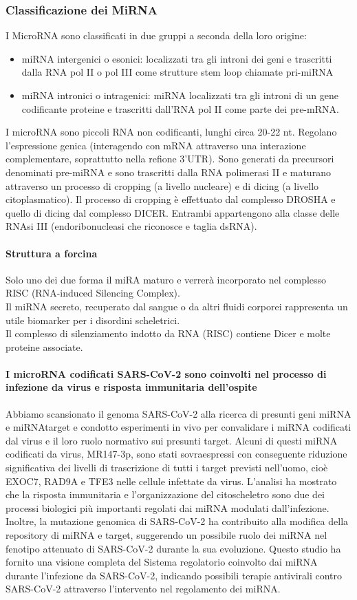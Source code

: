 \documentclass{article}
\begin{document}
\subsubsection{Classificazione dei MiRNA}
I MicroRNA sono classificati in due gruppi a seconda della loro origine:
\begin{itemize}
    \item miRNA intergenici o esonici: localizzati tra gli introni dei geni e trascritti dalla RNA pol II o pol III come strutture stem loop chiamate pri-miRNA
    \item miRNA intronici o intragenici: miRNA localizzati tra gli introni di un gene codificante proteine e trascritti dall'RNA pol II come parte dei pre-mRNA.
\end{itemize}
I microRNA sono piccoli RNA non codificanti, lunghi circa 20-22 nt. Regolano l'espressione genica (interagendo con mRNA attraverso una interazione complementare, soprattutto nella refione 3'UTR). Sono generati da precursori
denominati pre-miRNA e sono trascritti dalla RNA polimerasi II e maturano attraverso un processo di cropping (a livello nucleare) e di dicing (a livello citoplasmatico).
Il processo di cropping è effettuato dal complesso DROSHA e quello di dicing dal complesso DICER. Entrambi appartengono alla classe delle RNAsi III (endoribonucleasi che riconosce e taglia dsRNA).
\paragraph{Struttura a forcina}
Solo uno dei due forma il miRA maturo e verrerà incorporato nel complesso RISC (RNA-induced Silencing Complex).\\
Il miRNA secreto, recuperato dal sangue o da altri fluidi corporei rappresenta un utile biomarker per i disordini scheletrici.\\
Il complesso di silenziamento indotto da RNA (RISC) contiene Dicer e molte proteine associate.
\paragraph{I microRNA codificati SARS-CoV-2 sono coinvolti nel processo di infezione da virus e risposta immunitaria dell'ospite}
Abbiamo scansionato il genoma SARS-CoV-2 alla ricerca di presunti geni miRNA e miRNAtarget e condotto esperimenti in vivo per convalidare i miRNA codificati dal virus
e il loro ruolo normativo sui presunti target. Alcuni di questi miRNA codificati da virus, MR147-3p, sono stati sovraespressi con conseguente riduzione significativa
dei livelli di trascrizione di tutti i target previsti nell'uomo, cioè EXOC7, RAD9A e TFE3 nelle cellule infettate da virus. L'analisi ha mostrato che la risposta immunitaria
e l'organizzazione del citoscheletro sono due dei processi biologici più importanti regolati dai miRNA modulati dall'infezione. Inoltre, la mutazione genomica di SARS-CoV-2 ha contribuito alla modifica della repository di miRNA e
target, suggerendo un possibile ruolo dei miRNA nel fenotipo attenuato di SARS-CoV-2 durante la sua evoluzione. Questo studio ha fornito una visione completa del
Sistema regolatorio coinvolto dai miRNA durante l'infezione da SARS-CoV-2, indicando possibili terapie antivirali contro SARS-CoV-2 attraverso l'intervento nel regolamento dei miRNA.
\end{document}
